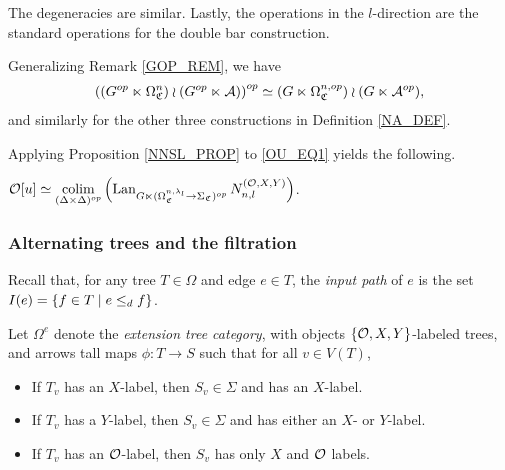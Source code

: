 \documentclass[a4paper,10pt
,draft
]{article}%
\renewcommand{\1}{\eta}%
\newcommand{\SC}{\Sigma_{\mathfrak C}}
\newcommand{\OC}{\Omega_{\mathfrak C}}
\begin{document}
\begin{definition}
      The degeneracies are similar.
      Lastly, the operations in the $l$-direction are the standard operations for the double bar construction.
\end{definition}

\begin{remark}
      Generalizing Remark \ref{GOP_REM},
      we have
      \begin{gather*}
            \left((G^{op} \ltimes \OC^n) \wr (G^{op} \ltimes \A)\right)^{op} \simeq
            (G \ltimes \OC^{n,op}) \wr (G \ltimes \A^{op}),
      \end{gather*}
      and similarly for the other three constructions in Definition \ref{NA_DEF}.
\end{remark}

Applying Proposition \ref{NNSL_PROP} to \eqref{OU_EQ1} yields the following.

\begin{proposition}
      \label{OU_RED1_PROP}
      $\mathcal{O}[u]
      \simeq
      \mathop{\operatorname{colim}}\limits_{(\Delta \times \Delta)^{op}} \left(
            \operatorname{Lan}_{G \ltimes (\Omega_{\mathfrak C}^{n,\lambda_l} \to \Sigma_{\mathfrak C})^{op}} N_{n,l}^{(\mathcal{O},X,Y)}
      \right)$.
\end{proposition}


\subsubsection{Alternating trees and the filtration}

Recall that, for any tree $T \in \Omega$ and edge $e \in T$, the \textit{input path} of $e$ is the set $I(e) = \left\{ f \in T \;|\; e \leq_d f\right\}$.

\begin{definition} 
      Let $\Omega^e$ denote the \textit{extension tree category}, with objects $\left\{\mathcal{O}, X,Y\right\}$-labeled trees, and arrows tall maps $\phi: T \to S$ such that for all $v \in V(T)$,
      \begin{itemize}
      \item If $T_v$ has an $X$-label, then $S_v \in \Sigma$ and has an $X$-label.
      \item If $T_v$ has a $Y$-label, then $S_v \in \Sigma$ and has either an $X$- or $Y$-label.
      \item If $T_v$ has an $\mathcal{O}$-label, then $S_v$ has only $X$ and $\mathcal{O}$ labels.
      \end{itemize}
\end{definition}
\end{document}
